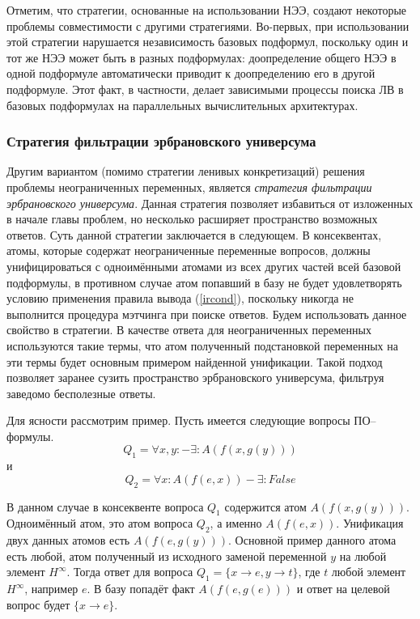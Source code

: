 Отметим, что стратегии, основанные на использовании НЭЭ, создают некоторые проблемы совместимости с другими стратегиями. Во-первых, при использовании этой стратегии нарушается независимость базовых подформул, поскольку один и тот же НЭЭ может быть в разных подформулах: доопределение общего НЭЭ в одной подформуле автоматически приводит к доопределению его в другой подформуле. Этот факт, в частности, делает зависимыми процессы поиска ЛВ в базовых подформулах на параллельных вычислительных архитектурах. %

\subsubsection{Стратегия фильтрации эрбрановского универсума}
Другим вариантом (помимо стратегии ленивых конкретизаций) решения проблемы неограниченных переменных, является \emph{стратегия фильтрации эрбрановского универсума}. Данная стратегия позволяет избавиться от изложенных в начале главы проблем, но несколько расширяет пространство возможных ответов. Суть данной стратегии заключается в следующем. В консеквентах, атомы, которые содержат неограниченные переменные вопросов, должны унифицироваться с одноимёнными атомами из всех других частей всей базовой подформулы, в противном случае атом попавший в базу не будет удовлетворять условию применения правила вывода (\ref{ircond}), поскольку никогда не выполнится процедура мэтчинга при поиске ответов. Будем использовать данное свойство в стратегии. В качестве ответа для неограниченных переменных используются такие термы, что атом полученный подстановкой переменных на эти термы будет основным примером найденной унификации. Такой подход позволяет заранее сузить пространство эрбрановского универсума, фильтруя заведомо бесполезные ответы.

Для ясности рассмотрим пример. Пусть имеется следующие вопросы ПО--формулы.
$$Q_1 = \forall x,y: - \exists: A(f(x,g(y)))$$
и
$$Q_2 = \forall x:A(f(e,x)) - \exists: False$$

В данном случае в консеквенте вопроса $Q_1$ содержится атом $A(f(x,g(y)))$. Одноимённый атом, это атом вопроса $Q_2$, а именно $A(f(e,x))$. Унификация двух данных атомов есть $A(f(e,g(y)))$. Основной пример данного атома есть любой, атом полученный из исходного заменой переменной $y$ на любой элемент $H^{\infty}$. Тогда ответ для вопроса $Q_1 = \{x \rightarrow e, y \rightarrow t\}$, где $t$ любой элемент $H^{\infty}$, например $e$. В базу попадёт факт $A(f(e,g(e)))$ и ответ на целевой вопрос будет $\{x \rightarrow e\}$.

